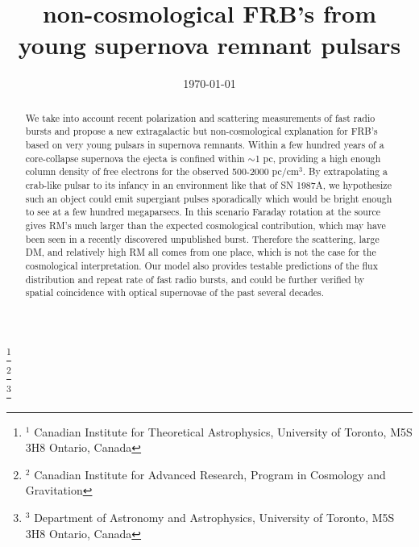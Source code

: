 \documentclass[useAMS,usenatbib]{emulateapj}
\begin{document}
\title{non-cosmological FRB's from young supernova remnant pulsars}
\author{}
\date{\today}

%
%

\begin{abstract}
We take into account recent polarization and scattering measurements of fast radio bursts
and propose a new extragalactic but non-cosmological explanation for FRB's based on
very young pulsars in supernova remnants. Within a few hundred years of a 
core-collapse supernova the ejecta 
is confined within $\sim$1 pc, providing a high enough column density of free electrons 
for the observed 500-2000 pc/cm$^3$. By extrapolating a crab-like pulsar to 
its infancy in an environment like that of SN 1987A, 
we hypothesize such an object could emit supergiant pulses sporadically which 
would be bright enough to see at a few hundred megaparsecs. In this scenario Faraday
rotation at the source gives RM's much larger than the expected cosmological contribution,
which may have been seen in a recently discovered unpublished burst. Therefore the scattering,
large DM, and relatively high RM all comes from one place, which is not the case for the cosmological
interpretation. Our model also provides
testable predictions of the flux distribution and repeat rate of fast radio bursts, and could be further
verified by spatial coincidence with optical supernovae of the past several decades. 

\end{abstract}

\footnote{$^1$ Canadian Institute for Theoretical Astrophysics, University of Toronto, M5S 3H8 Ontario, Canada} \\
\footnote{$^2$ Canadian Institute for Advanced Research, Program in Cosmology
and Gravitation}\\
\footnote{$^3$ Department of Astronomy and Astrophysics, University of Toronto,
M5S 3H8 Ontario, Canada}


\newcommand{\be}{\begin{eqnarray}}
\newcommand{\ee}{\end{eqnarray}}
\newcommand{\beq}{\begin{equation}}
\newcommand{\eeq}{\end{equation}}
\end{document}
